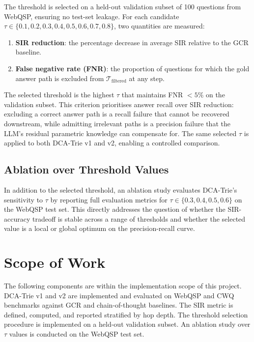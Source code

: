 The threshold is selected on a held-out validation subset of 100 questions from WebQSP, ensuring no test-set leakage. For each candidate $\tau \in \{0.1, 0.2, 0.3, 0.4, 0.5, 0.6, 0.7, 0.8\}$, two quantities are measured:

\begin{enumerate}[label=(\roman*)]
    \item \textbf{SIR reduction}: the percentage decrease in average SIR relative to the GCR baseline.
    \item \textbf{False negative rate (FNR)}: the proportion of questions for which the gold answer path is excluded from $\mathcal{T}_{\text{filtered}}$ at any step.
\end{enumerate}

The selected threshold is the highest $\tau$ that maintains FNR $< 5\%$ on the validation subset. This criterion prioritises answer recall over SIR reduction: excluding a correct answer path is a recall failure that cannot be recovered downstream, while admitting irrelevant paths is a precision failure that the LLM's residual parametric knowledge can compensate for. The same selected $\tau$ is applied to both DCA-Trie v1 and v2, enabling a controlled comparison.

\subsection{Ablation over Threshold Values}

In addition to the selected threshold, an ablation study evaluates DCA-Trie's sensitivity to $\tau$ by reporting full evaluation metrics for $\tau \in \{0.3, 0.4, 0.5, 0.6\}$ on the WebQSP test set. This directly addresses the question of whether the SIR-accuracy tradeoff is stable across a range of thresholds and whether the selected value is a local or global optimum on the precision-recall curve.

\section{Scope of Work}
\label{sec:scope}

The following components are within the implementation scope of this project. DCA-Trie v1 and v2 are implemented and evaluated on WebQSP and CWQ benchmarks against GCR and chain-of-thought baselines. The SIR metric is defined, computed, and reported stratified by hop depth. The threshold selection procedure is implemented on a held-out validation subset. An ablation study over $\tau$ values is conducted on the WebQSP test set.

